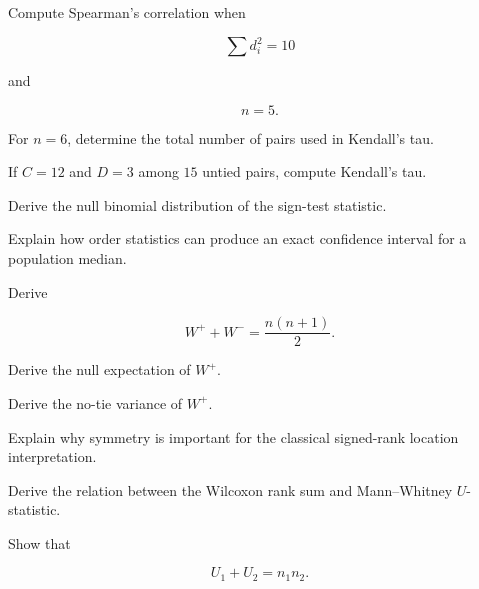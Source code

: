 \begin{exercise}[2]
Compute Spearman's correlation when

\[
\sum d_i^2=10
\]

and

\[
n=5.
\]
\end{exercise}

\begin{exercise}[2]
For \(n=6\), determine the total number of pairs used in Kendall's tau.
\end{exercise}

\begin{exercise}[2]
If \(C=12\) and \(D=3\) among \(15\) untied pairs, compute Kendall's tau.
\end{exercise}

\begin{exercise}[3]
Derive the null binomial distribution of the sign-test statistic.
\end{exercise}

\begin{exercise}[3]
Explain how order statistics can produce an exact confidence interval for
a population median.
\end{exercise}

\begin{exercise}[3]
Derive

\[
W^++W^-
=
\frac{
n(n+1)
}{2}.
\]
\end{exercise}

\begin{exercise}[3]
Derive the null expectation of \(W^+\).
\end{exercise}

\begin{exercise}[3]
Derive the no-tie variance of \(W^+\).
\end{exercise}

\begin{exercise}[3]
Explain why symmetry is important for the classical signed-rank location
interpretation.
\end{exercise}

\begin{exercise}[3]
Derive the relation between the Wilcoxon rank sum and Mann--Whitney
\(U\)-statistic.
\end{exercise}

\begin{exercise}[3]
Show that

\[
U_1+U_2=n_1n_2.
\]
\end{exercise}

